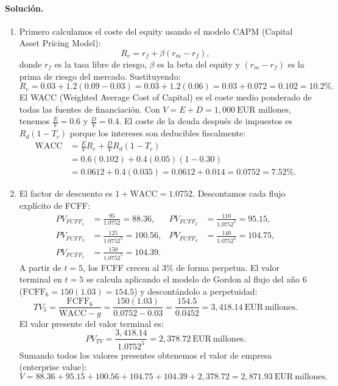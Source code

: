 \documentclass[12pt,a4paper]{article}
\newcommand{\EUR}[1]{\ensuremath{#1~\text{EUR}}}
\newenvironment{solucion}{\paragraph{Solución.}}{}
\begin{document}
\begin{solucion}
\begin{enumerate}[label=\alph*)]
  \item Primero calculamos el coste del equity usando el modelo CAPM (Capital Asset Pricing Model):
  \[
  R_e = r_f + \beta(r_m - r_f),
  \]
  donde $r_f$ es la tasa libre de riesgo, $\beta$ es la beta del equity y $(r_m - r_f)$ es la prima de riesgo del mercado. Sustituyendo:
  \[
  R_e = 0.03 + 1.2(0.09-0.03) = 0.03 + 1.2(0.06) = 0.03 + 0.072 = 0.102 = 10.2\%.
  \]
  El WACC (Weighted Average Cost of Capital) es el coste medio ponderado de todas las fuentes de financiación. Con $V=E+D=\EUR{1{,}000}$ millones, tenemos $\tfrac{E}{V}=0.6$ y $\tfrac{D}{V}=0.4$. El coste de la deuda después de impuestos es $R_d(1-T_c)$ porque los intereses son deducibles fiscalmente:
  \begin{align*}
  \text{WACC} &= \frac{E}{V} R_e + \frac{D}{V} R_d(1-T_c)\\
              &= 0.6(0.102) + 0.4(0.05)(1-0.30)\\
              &= 0.0612 + 0.4(0.035) = 0.0612 + 0.014 = 0.0752 = 7.52\%.
  \end{align*}
  
  \item El factor de descuento es $1+\text{WACC}=1.0752$. Descontamos cada flujo explícito de FCFF:
  \begin{align*}
  PV_{FCFF_1} &= \frac{95}{1.0752} = 88.36, &
  PV_{FCFF_2} &= \frac{110}{1.0752^2} = 95.15,\\[-2pt]
  PV_{FCFF_3} &= \frac{125}{1.0752^3} = 100.56, &
  PV_{FCFF_4} &= \frac{140}{1.0752^4} = 104.75,\\[-2pt]
  PV_{FCFF_5} &= \frac{150}{1.0752^5} = 104.39.
  \end{align*}
  A partir de $t=5$, los FCFF crecen al 3\% de forma perpetua. El valor terminal en $t=5$ se calcula aplicando el modelo de Gordon al flujo del año 6 ($\text{FCFF}_6 = 150(1.03) = 154.5$) y descontándolo a perpetuidad:
  \[
  TV_5 = \frac{\text{FCFF}_6}{\text{WACC}-g} = \frac{150(1.03)}{0.0752-0.03} = \frac{154.5}{0.0452} = \EUR{3{,}418.14}~\text{millones}.
  \]
  El valor presente del valor terminal es:
  \[
  PV_{TV} = \frac{3{,}418.14}{1.0752^5} = \EUR{2{,}378.72}~\text{millones}.
  \]
  Sumando todos los valores presentes obtenemos el valor de empresa (enterprise value):
  \[
  V = 88.36 + 95.15 + 100.56 + 104.75 + 104.39 + 2{,}378.72 = \EUR{2{,}871.93}~\text{millones}.
  \]


\end{enumerate}
\end{solucion}
\end{document}
